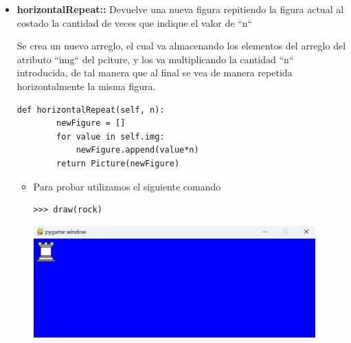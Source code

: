 \documentclass{article}
\begin{document}
\begin{itemize}
  \item \textbf{horizontalRepeat::} Devuelve una nueva figura repitiendo la figura actual al costado la cantidad de veces que indique el valor de ``n``
  
  \vspace{\baselineskip}

  Se crea un nuevo arreglo, el cual va almacenando los elementos del arreglo del atributo ``img`` del pciture, y los va multiplicando la cantidad ``n`` introducida, de tal manera que al final se vea de manera repetida horizontalmente la misma figura.  
    
    \begin{lstlisting}[style=python]
    def horizontalRepeat(self, n):
        newFigure = []
        for value in self.img:
            newFigure.append(value*n)
        return Picture(newFigure)
    \end{lstlisting}

    \vspace{\baselineskip}

    \begin{itemize}
      \item Para probar utilizamos el siguiente comando

      \begin{lstlisting}[style=shell]
      >>> draw(rock)
      \end{lstlisting}
      \begin{minipage}{\linewidth}
        \centering
        \includegraphics[width=0.9\textwidth]{imagenes/p_horizontalr1.png}
      \end{minipage}

      \vspace{2\baselineskip}


\end{itemize}
\end{itemize}
\end{document}

